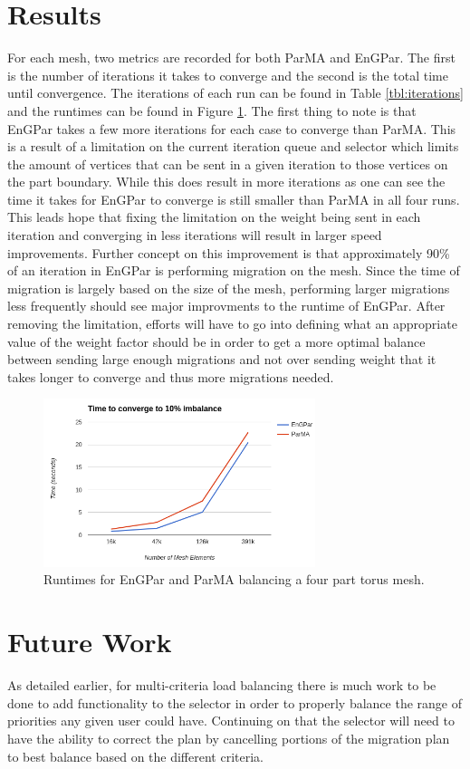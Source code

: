 \documentclass[a4paper]{article}
\begin{document}
\section{Results}
For each mesh, two metrics are recorded for both ParMA and EnGPar. The first is the number of iterations it takes to converge and the second is the total time until convergence. The iterations of each run can be found in Table \ref{tbl:iterations} and the runtimes can be found in Figure \ref{fig:runtime}. The first thing to note is that EnGPar takes a few more iterations for each case to converge than ParMA. This is a result of a limitation on the current iteration queue and selector which limits the amount of vertices that can be sent in a given iteration to those vertices on the part boundary. While this does result in more iterations as one can see the time it takes for EnGPar to converge is still smaller than ParMA in all four runs. This leads hope that fixing the limitation on the weight being sent in each iteration and converging in less iterations will result in larger speed improvements. Further concept on this improvement is that approximately 90\% of an iteration in EnGPar is performing migration on the mesh. Since the time of migration is largely based on the size of the mesh, performing larger migrations less frequently should see major improvments to the runtime of EnGPar. After removing the limitation, efforts will have to go into defining what an appropriate value of the weight factor should be in order to get a more optimal balance between sending large enough migrations and not over sending weight that it takes longer to converge and thus more migrations needed.

\begin{figure}[!ht]
  \label{fig:runtime}
  \centering
  \includegraphics[width=300px]{timeTorus.png}
  \caption{Runtimes for EnGPar and ParMA balancing a four part torus mesh.}
\end{figure}

\section{Future Work}
As detailed earlier, for multi-criteria load balancing there is much work to be done to add functionality to the selector in order to properly balance the range of priorities any given user could have. Continuing on that the selector will need to have the ability to correct the plan by cancelling portions of the migration plan to best balance based on the different criteria.
\end{document}
